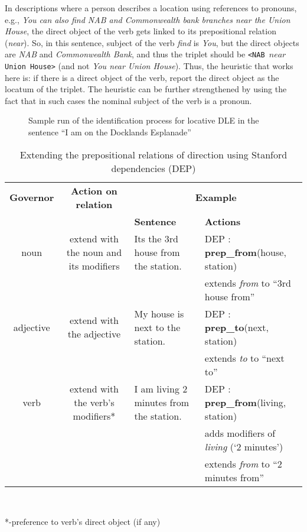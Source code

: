 \documentclass{acm_proc_article-sp}
\begin{document}
In descriptions where a person describes a location using references to pronouns, e.g., \textit{You can also find NAB and Commonwealth bank branches near the Union House}, the direct object of the verb gets linked to its prepositional relation (\textit{near}). So, in this sentence, subject of the verb \textit{find} is \textit{You}, but the direct objects are \textit{NAB} and \textit{Commonwealth Bank}, and thus the triplet should be \texttt{<NAB $near$ Union House>} (and not \textit{You near Union House}). Thus, the heuristic that works here is: if there is a direct object of the verb, report the direct object as the locatum of the triplet. The heuristic can be further strengthened by using the fact that in such cases the nominal subject of the verb is a pronoun.
\begin{figure}
\centering
\caption{Sample run of the identification process for locative DLE in the sentence  ``I am on the Docklands Esplanade''}
\label{fig:phase1}
\end{figure}
\begin{table*}
\centering
\caption{Extending the prepositional relations of direction using Stanford dependencies (DEP)}
\begin{tabular}{|c|c|p{4cm}|p{5cm}|} \hline
\textbf{Governor}&\textbf{Action on relation}&\multicolumn{2}{|c|}{\textbf{Example}} \\ \cline{3-4}
&&\textbf{Sentence}&\textbf{Actions}\\ \hline
noun & extend with the noun and its modifiers&Its the 3rd house from the station.&DEP : \textbf{prep\_from}(house, station) \\&&&extends \textit{from} to ``3rd house from'' \\ \hline
adjective & extend with the adjective&My house is next to the station.&DEP : {\textbf{prep\_to}}(next, station) \\&&& extends \textit{to} to ``next to''\\ \hline
verb & extend with the verb's modifiers*&I am living 2 minutes from the station.&DEP : \textbf{prep\_from}(living, station)\\&&& adds modifiers of \textit{living} (`2 minutes')\\&&& extends \textit{from} to ``2 minutes from''\\
\hline\end{tabular}
\\ \begin{flushleft}
*-preference to verb's direct object (if any)
\end{flushleft}
\label{table:partial}
\end{table*}
\end{document}
